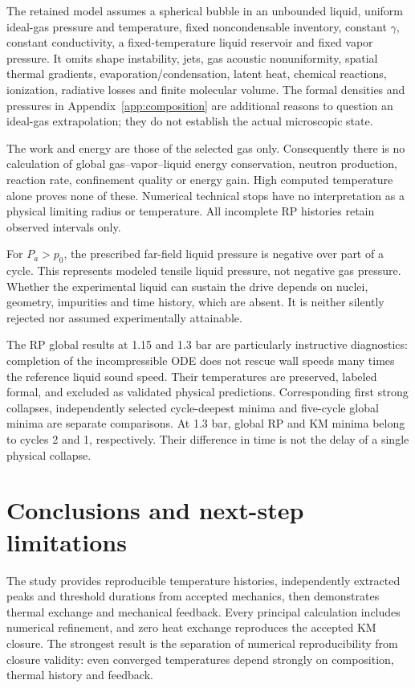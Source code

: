 \documentclass[10pt,a4paper]{article}
\begin{document}
The retained model assumes a spherical bubble in an unbounded liquid, uniform ideal-gas pressure and temperature, fixed noncondensable inventory, constant $\gamma$, constant conductivity, a fixed-temperature liquid reservoir and fixed vapor pressure. It omits shape instability, jets, gas acoustic nonuniformity, spatial thermal gradients, evaporation/condensation, latent heat, chemical reactions, ionization, radiative losses and finite molecular volume. The formal densities and pressures in Appendix~\ref{app:composition} are additional reasons to question an ideal-gas extrapolation; they do not establish the actual microscopic state.

The work and energy are those of the selected gas only. Consequently there is no calculation of global gas--vapor--liquid energy conservation, neutron production, reaction rate, confinement quality or energy gain. High computed temperature alone proves none of these. Numerical technical stops have no interpretation as a physical limiting radius or temperature. All incomplete RP histories retain observed intervals only.

For $P_a>p_0$, the prescribed far-field liquid pressure is negative over part of a cycle. This represents modeled tensile liquid pressure, not negative gas pressure. Whether the experimental liquid can sustain the drive depends on nuclei, geometry, impurities and time history, which are absent. It is neither silently rejected nor assumed experimentally attainable.

The RP global results at 1.15 and 1.3 bar are particularly instructive diagnostics: completion of the incompressible ODE does not rescue wall speeds many times the reference liquid sound speed. Their temperatures are preserved, labeled formal, and excluded as validated physical predictions. Corresponding first strong collapses, independently selected cycle-deepest minima and five-cycle global minima are separate comparisons. At 1.3 bar, global RP and KM minima belong to cycles 2 and 1, respectively. Their difference in time is not the delay of a single physical collapse.

\section{Conclusions and next-step limitations}
The study provides reproducible temperature histories, independently extracted peaks and threshold durations from accepted mechanics, then demonstrates thermal exchange and mechanical feedback. Every principal calculation includes numerical refinement, and zero heat exchange reproduces the accepted KM closure. The strongest result is the separation of numerical reproducibility from closure validity: even converged temperatures depend strongly on composition, thermal history and feedback.
\end{document}
